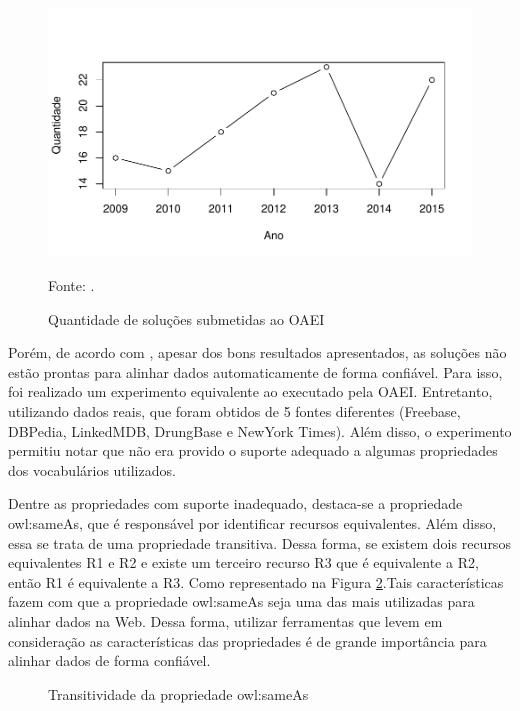 \begin{figure}[!ht]
	\centering
	\includegraphics[width=1\textwidth]{./imagens/im_tools.pdf}
    \caption{Quantidade de soluções submetidas ao OAEI}
	\footnotesize{Fonte: \cite{cheatham2015results}.}
	\label{fig:oaei_imtools}
\end{figure}

Porém, de acordo com , apesar dos bons resultados apresentados, as soluções não estão prontas para alinhar dados automaticamente de forma confiável. Para isso, foi realizado um experimento equivalente ao executado pela OAEI. Entretanto, utilizando dados reais, que foram obtidos de 5 fontes diferentes (Freebase, DBPedia, LinkedMDB, DrungBase e NewYork Times). Além disso, o experimento permitiu notar que não era provido o suporte adequado a algumas propriedades dos vocabulários utilizados.
	
Dentre as propriedades com suporte inadequado, destaca-se a propriedade owl:sameAs, que é responsável por identificar recursos equivalentes. Além disso, essa se trata de uma propriedade transitiva. Dessa forma, se existem dois recursos equivalentes R1 e R2 e existe um terceiro recurso R3 que é equivalente a R2, então R1 é equivalente a R3. Como representado na Figura \ref{sameAs}.Tais características fazem com que a propriedade owl:sameAs seja uma das  mais utilizadas para alinhar dados na Web. Dessa forma, utilizar ferramentas que levem em consideração as características das propriedades é de grande importância para alinhar dados de forma confiável.

\begin{figure}[h]
\centering
{}
\caption{Transitividade da propriedade owl:sameAs}
\label{sameAs}
\end{figure}

